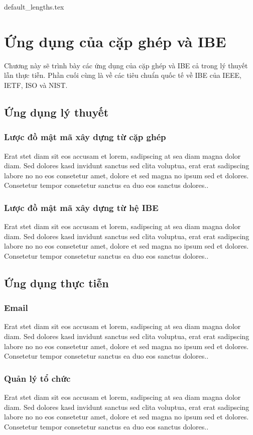 \documentclass[class=report, crop=false]{standalone}
\begin{document}
	{default_lengths.tex}
	\chapter{Ứng dụng của cặp ghép và IBE}
	Chương này sẽ trình bày các ứng dụng của cặp ghép và IBE cả trong lý thuyết lẫn thực tiễn. Phần cuối cùng là về các tiêu chuẩn quốc tế về IBE của IEEE, IETF, ISO và NIST.
	\section{Ứng dụng lý thuyết}
		\subsection{Lược đồ mật mã xây dựng từ cặp ghép}
			Erat stet diam sit eos accusam et lorem, sadipscing at sea diam magna dolor diam. Sed dolores kasd invidunt sanctus sed clita voluptua, erat erat sadipscing labore no no eos consetetur amet, dolore et sed magna no ipsum sed et dolores. Consetetur tempor consetetur sanctus ea duo eos sanctus dolores..
		\subsection{Lược đồ mật mã xây dựng từ hệ IBE}
			Erat stet diam sit eos accusam et lorem, sadipscing at sea diam magna dolor diam. Sed dolores kasd invidunt sanctus sed clita voluptua, erat erat sadipscing labore no no eos consetetur amet, dolore et sed magna no ipsum sed et dolores. Consetetur tempor consetetur sanctus ea duo eos sanctus dolores..
	\section{Ứng dụng thực tiễn}
		\subsection{Email}
			Erat stet diam sit eos accusam et lorem, sadipscing at sea diam magna dolor diam. Sed dolores kasd invidunt sanctus sed clita voluptua, erat erat sadipscing labore no no eos consetetur amet, dolore et sed magna no ipsum sed et dolores. Consetetur tempor consetetur sanctus ea duo eos sanctus dolores..
		\subsection{Quản lý tổ chức}
			Erat stet diam sit eos accusam et lorem, sadipscing at sea diam magna dolor diam. Sed dolores kasd invidunt sanctus sed clita voluptua, erat erat sadipscing labore no no eos consetetur amet, dolore et sed magna no ipsum sed et dolores. Consetetur tempor consetetur sanctus ea duo eos sanctus dolores..
\end{document}
